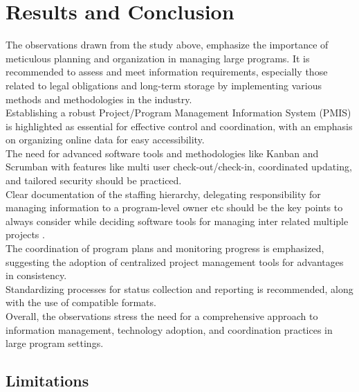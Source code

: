 \documentclass{llncs}
\begin{document}
\section{Results and Conclusion}
The observations drawn from the study above, emphasize the importance of meticulous planning and organization in managing large programs. It is recommended to assess and meet information requirements, especially those related to legal obligations and long-term storage by implementing various methods and methodologies in the industry.~\cite{refpaper8} \\
Establishing a robust Project/Program Management Information System (PMIS) is highlighted as essential for effective control and coordination, with an emphasis on organizing online data for easy accessibility. ~\cite{refpaper8}~\cite{refpaper1}~\cite{refpaper2}\\
The need for advanced software tools and methodologies like Kanban and Scrumban with features like multi user check-out/check-in, coordinated updating, and tailored security should be practiced. \\
Clear documentation of the staffing hierarchy, delegating responsibility for managing information to a program-level owner etc should be the key points to always consider while deciding software tools for managing inter related multiple projects .~\cite{refpaper8} \\
The coordination of program plans and monitoring progress is emphasized, suggesting the adoption of centralized project management tools for advantages in consistency. \\
Standardizing processes for status collection and reporting is recommended, along with the use of compatible formats. \\
Overall, the observations stress the need for a comprehensive approach to information management, technology adoption, and coordination practices in large program settings.~\cite{refpaper8}~\cite{refpaper2}
\subsection{Limitations}
\end{document}
